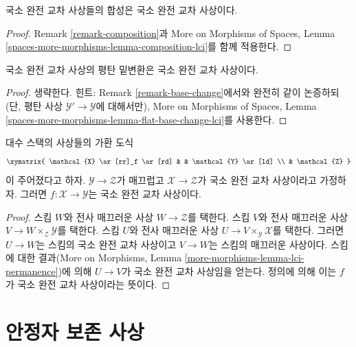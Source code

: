 \begin{lemma}
\label{lemma-composition-lci}
국소 완전 교차 사상들의 합성은 국소 완전 교차 사상이다.
\end{lemma}

\begin{proof}
Remark \ref{remark-composition}과 More on Morphisms of Spaces, Lemma
\ref{spaces-more-morphisms-lemma-composition-lci}를 함께 적용한다.
\end{proof}

\begin{lemma}
\label{lemma-flat-base-change-lci}
국소 완전 교차 사상의 평탄 밑변환은 국소 완전 교차 사상이다.
\end{lemma}

\begin{proof}
생략한다. 힌트: Remark \ref{remark-base-change}에서와 완전히 같이
논증하되(단, 평탄 사상 $\mathcal{Y}' \to \mathcal{Y}$에 대해서만),
More on Morphisms of Spaces, Lemma
\ref{spaces-more-morphisms-lemma-flat-base-change-lci}를 사용한다.
\end{proof}

\begin{lemma}
\label{lemma-lci-permanence}
대수 스택의 사상들의 가환 도식
$$
\xymatrix{
\mathcal{X} \ar[rr]_f \ar[rd] & & \mathcal{Y} \ar[ld] \\
& \mathcal{Z}
}
$$
이 주어졌다고 하자. $\mathcal{Y} \to \mathcal{Z}$가 매끄럽고
$\mathcal{X} \to \mathcal{Z}$가 국소 완전 교차 사상이라고 가정하자.
그러면 $f : \mathcal{X} \to \mathcal{Y}$는 국소 완전 교차 사상이다.
\end{lemma}

\begin{proof}
스킴 $W$와 전사 매끄러운 사상 $W \to \mathcal{Z}$를 택한다. 스킴
$V$와 전사 매끄러운 사상
$V \to W \times_\mathcal{Z} \mathcal{Y}$를 택한다. 스킴 $U$와 전사
매끄러운 사상 $U \to V \times_\mathcal{Y} \mathcal{X}$를 택한다.
그러면 $U \to W$는 스킴의 국소 완전 교차 사상이고 $V \to W$는 스킴의
매끄러운 사상이다. 스킴에 대한 결과(More on Morphisms, Lemma
\ref{more-morphisms-lemma-lci-permanence})에 의해 $U \to V$가 국소 완전
교차 사상임을 얻는다. 정의에 의해 이는 $f$가 국소 완전 교차 사상이라는
뜻이다.
\end{proof}





\section{안정자 보존 사상}
\label{section-stabilizer-preserving}

